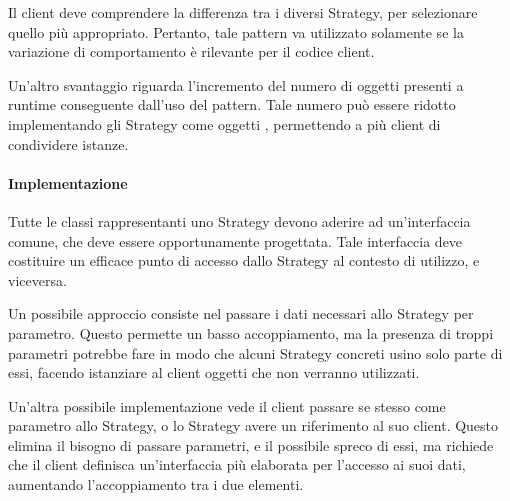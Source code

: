 Il client deve comprendere la differenza tra i diversi Strategy, per selezionare
quello più appropriato. Pertanto, tale pattern va utilizzato solamente se la
variazione di comportamento è rilevante per il codice client.

Un'altro svantaggio riguarda l'incremento del numero di oggetti presenti a
runtime conseguente dall'uso del pattern. Tale numero può essere ridotto
implementando gli Strategy come oggetti , permettendo a più
client di condividere istanze.

\paragraph{Implementazione}

Tutte le classi rappresentanti uno Strategy devono aderire ad un'interfaccia
comune, che deve essere opportunamente progettata. Tale interfaccia deve
costituire un efficace punto di accesso dallo Strategy al contesto di utilizzo,
e viceversa.

Un possibile approccio consiste nel passare i dati necessari allo Strategy per
parametro. Questo permette un basso accoppiamento, ma la presenza di troppi
parametri potrebbe fare in modo che alcuni Strategy concreti usino solo
parte di essi, facendo istanziare al client oggetti che non verranno utilizzati.

Un'altra possibile implementazione vede il client passare se stesso come
parametro allo Strategy, o lo Strategy avere un riferimento al suo client.
Questo elimina il bisogno di passare parametri, e il possibile spreco di essi,
ma richiede che il client definisca un'interfaccia più elaborata per l'accesso
ai suoi dati, aumentando l'accoppiamento tra i due elementi.

